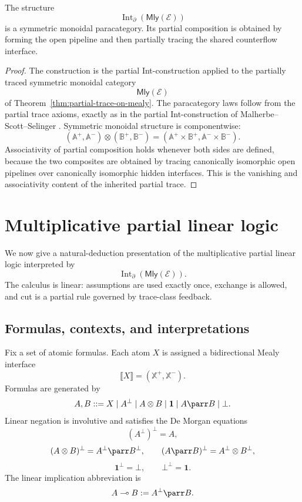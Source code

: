 \begin{theorem}
\label{thm:partial-goi-mealy}
The structure
\[
\operatorname{Int}_{\partial}(\mathsf{Mly}(\mathcal E))
\]
is a symmetric monoidal paracategory.  Its partial composition is obtained by
forming the open pipeline and then partially tracing the shared counterflow
interface.
\end{theorem}

\begin{proof}
The construction is the partial Int-construction applied to the partially
traced symmetric monoidal category
\[
\mathsf{Mly}(\mathcal E)
\]
of Theorem~\ref{thm:partial-trace-on-mealy}.  The paracategory laws follow
from the partial trace axioms, exactly as in the partial Int-construction of
Malherbe--Scott--Selinger
\cite{MalherbeScottSelingerPartiallyTracedCategories}.  Symmetric monoidal
structure is componentwise:
\[
(\mathbb A^+,\mathbb A^-)\otimes(\mathbb B^+,\mathbb B^-)
=
(\mathbb A^+\times\mathbb B^+,\mathbb A^-\times\mathbb B^-).
\]
Associativity of partial composition holds whenever both sides are defined,
because the two composites are obtained by tracing canonically isomorphic
open pipelines over canonically isomorphic hidden interfaces.  This is the
vanishing and associativity content of the inherited partial trace.
\end{proof}

\section{Multiplicative partial linear logic}
\label{sec:multiplicative-partial-linear-logic-mealy}

We now give a natural-deduction presentation of the multiplicative partial
linear logic interpreted by
\[
\operatorname{Int}_{\partial}(\mathsf{Mly}(\mathcal E)).
\]
The calculus is linear: assumptions are used exactly once, exchange is allowed,
and cut is a partial rule governed by trace-class feedback.

\subsection{Formulas, contexts, and interpretations}

Fix a set of atomic formulas.  Each atom \(X\) is assigned a bidirectional
Mealy interface
\[
\llbracket X\rrbracket=(\mathbb X^+,\mathbb X^-).
\]
Formulas are generated by
\[
A,B ::= X \mid A^\bot \mid A\otimes B \mid \mathbf 1
        \mid A\parr B \mid \bot .
\]
Linear negation is involutive and satisfies the De Morgan equations
\[
(A^\bot)^\bot=A,
\]
\[
(A\otimes B)^\bot=A^\bot\parr B^\bot,
\qquad
(A\parr B)^\bot=A^\bot\otimes B^\bot,
\]
\[
\mathbf 1^\bot=\bot,
\qquad
\bot^\bot=\mathbf 1.
\]
The linear implication abbreviation is
\[
A\multimap B:=A^\bot\parr B.
\]

